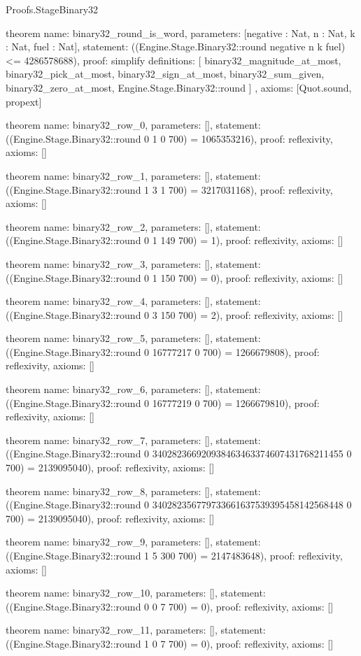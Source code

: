 \begin{lexlean}{Proofs.StageBinary32}
\begin{semanticmodule}
theorem{
  name: binary32_round_is_word,
  parameters: [negative : Nat, n : Nat, k : Nat, fuel : Nat],
  statement: ((Engine.Stage.Binary32::round negative n k fuel) <= 4286578688),
  proof: simplify{
    definitions: [
      binary32_magnitude_at_most,
      binary32_pick_at_most,
      binary32_sign_at_most,
      binary32_sum_given,
      binary32_zero_at_most,
      Engine.Stage.Binary32::round
    ]
  },
  axioms: [Quot.sound, propext]
}

theorem{
  name: binary32_row_0,
  parameters: [],
  statement: ((Engine.Stage.Binary32::round 0 1 0 700) = 1065353216),
  proof: reflexivity{},
  axioms: []
}

theorem{
  name: binary32_row_1,
  parameters: [],
  statement: ((Engine.Stage.Binary32::round 1 3 1 700) = 3217031168),
  proof: reflexivity{},
  axioms: []
}

theorem{
  name: binary32_row_2,
  parameters: [],
  statement: ((Engine.Stage.Binary32::round 0 1 149 700) = 1),
  proof: reflexivity{},
  axioms: []
}

theorem{
  name: binary32_row_3,
  parameters: [],
  statement: ((Engine.Stage.Binary32::round 0 1 150 700) = 0),
  proof: reflexivity{},
  axioms: []
}

theorem{
  name: binary32_row_4,
  parameters: [],
  statement: ((Engine.Stage.Binary32::round 0 3 150 700) = 2),
  proof: reflexivity{},
  axioms: []
}

theorem{
  name: binary32_row_5,
  parameters: [],
  statement: ((Engine.Stage.Binary32::round 0 16777217 0 700) = 1266679808),
  proof: reflexivity{},
  axioms: []
}

theorem{
  name: binary32_row_6,
  parameters: [],
  statement: ((Engine.Stage.Binary32::round 0 16777219 0 700) = 1266679810),
  proof: reflexivity{},
  axioms: []
}

theorem{
  name: binary32_row_7,
  parameters: [],
  statement: ((Engine.Stage.Binary32::round 0 340282366920938463463374607431768211455 0 700) = 2139095040),
  proof: reflexivity{},
  axioms: []
}

theorem{
  name: binary32_row_8,
  parameters: [],
  statement: ((Engine.Stage.Binary32::round 0 340282356779733661637539395458142568448 0 700) = 2139095040),
  proof: reflexivity{},
  axioms: []
}

theorem{
  name: binary32_row_9,
  parameters: [],
  statement: ((Engine.Stage.Binary32::round 1 5 300 700) = 2147483648),
  proof: reflexivity{},
  axioms: []
}

theorem{
  name: binary32_row_10,
  parameters: [],
  statement: ((Engine.Stage.Binary32::round 0 0 7 700) = 0),
  proof: reflexivity{},
  axioms: []
}

theorem{
  name: binary32_row_11,
  parameters: [],
  statement: ((Engine.Stage.Binary32::round 1 0 7 700) = 0),
  proof: reflexivity{},
  axioms: []
}
\end{semanticmodule}
\end{lexlean}
